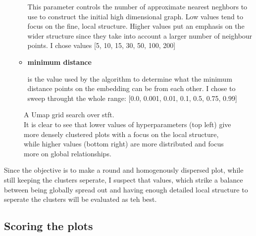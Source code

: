 \documentclass[11pt]{article}
\begin{document}
\begin{itemize}
\begin{itemize}
This parameter controls the number of approximate nearest neghbors to use to construct the initial high dimensional graph. Low values tend to focus on the fine, local structure. Higher values put an emphasis on the wider structure since they take into account a larger number of neighbour points. I chose values [5, 10, 15, 30, 50, 100, 200]

  \item \textbf{ minimum distance }

is the value used by the algorithm to determine what the minimum distance points on the embedding can be from each other. I chose to sweep throught the whole range: [0.0, 0.001, 0.01, 0.1, 0.5, 0.75, 0.99]
\end{itemize}
\end{itemize}

\begin{figure}[h!tbp]
\centering
{}
\caption{A Umap grid search over stft.\\ It is clear to see that lower values of hyperparameters (top left) give more densely clustered plots with a focus on the local structure, while higher values (bottom right) are more distributed and focus more on global relationships.}
\end{figure}

Since the objective is to make a round and homogenously dispersed plot, while still keeping the clusters seperate, I suspect that values, which strike a balance between being globally spread out and having enough detailed local structure to seperate the clusters will be evaluated as teh best.

\subsection{Scoring the plots}
\label{sec:org007743d}
\end{document}
